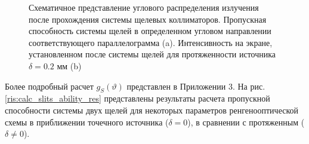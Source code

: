 \begin{figure}[H]
  \centering
  \hfill
  \caption{Схематичное представление углового распределения излучения после
  прохождения системы щелевых коллиматоров. Пропускная способность системы
  щелей в определенном угловом направлении соответствующего параллелограмма (a).
   Интенсивность на экране, установленном после системы щелей для
   протяженности источника $\delta = 0.2$ мм (b)}
  \label{ris:how_many_quants_use_parallelogr}
\end{figure}
Более подробный расчет $g_S(\vartheta)$ представлен в Приложении 3.
На рис. \ref{ris:calc_slits_ability_res} представлены результаты расчета пропускной способности
системы двух щелей для некоторых параметров ренгенооптической схемы в приближении
 точечного источника ($\delta = 0$), в сравнении с протяженным ($\delta \neq 0$).

